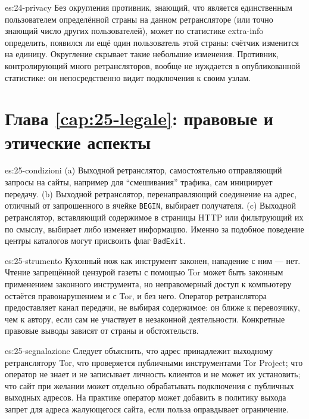 \begin{soluzione}{es:24-privacy}
Без округления противник, знающий, что является единственным пользователем определённой страны на данном ретрансляторе (или точно знающий число других пользователей), может по статистике extra-info определить, появился ли ещё один пользователь этой страны: счётчик изменится на единицу. Округление скрывает такие небольшие изменения. Противник, контролирующий много ретрансляторов, вообще не нуждается в опубликованной статистике: он непосредственно видит подключения к своим узлам.
\end{soluzione}

\section*{Глава \ref{cap:25-legale}: правовые и этические аспекты}

\begin{soluzione}{es:25-condizioni}
(a) Выходной ретранслятор, самостоятельно отправляющий запросы на сайты, например для \enquote{смешивания} трафика, сам инициирует передачу. (b) Выходной ретранслятор, перенаправляющий соединение на адрес, отличный от запрошенного в ячейке \texttt{BEGIN}, выбирает получателя. (c) Выходной ретранслятор, вставляющий содержимое в страницы HTTP или фильтрующий их по смыслу, выбирает либо изменяет информацию. Именно за подобное поведение центры каталогов могут присвоить флаг \texttt{BadExit}.
\end{soluzione}

\begin{soluzione}{es:25-strumento}
Кухонный нож как инструмент законен, нападение с ним — нет. Чтение запрещённой цензурой газеты с помощью Tor может быть законным применением законного инструмента, но неправомерный доступ к компьютеру остаётся правонарушением и с Tor, и без него. Оператор ретранслятора предоставляет канал передачи, не выбирая содержимое: он ближе к перевозчику, чем к автору, если сам не участвует в незаконной деятельности. Конкретные правовые выводы зависят от страны и обстоятельств.
\end{soluzione}

\begin{soluzione}{es:25-segnalazione}
Следует объяснить, что адрес принадлежит выходному ретранслятору Tor, что проверяется публичными инструментами Tor Project; что оператор не знает и не записывает личность клиентов и не может их установить; что сайт при желании может отдельно обрабатывать подключения с публичных выходных адресов. На практике оператор может добавить в политику выхода запрет для адреса жалующегося сайта, если польза оправдывает ограничение.
\end{soluzione}

